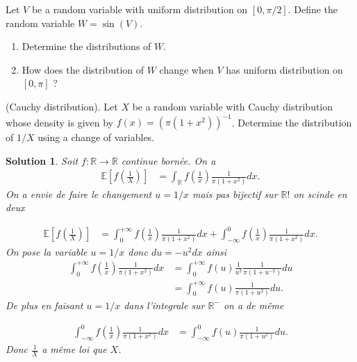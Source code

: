 \documentclass{article}
\newtheorem{solution}{Solution}
\begin{document}
\begin{Exercise} Let $V$ be a random variable with uniform distribution on $[0, \pi / 2]$. Define the random variable $W=\sin (V)$.
  \begin{enumerate}
    \item Determine the distributions of $W$.

    \item How does the distribution of $W$ change when $V$ has uniform distribution on
          $[0, \pi]$ ?

  \end{enumerate}
\end{Exercise}

\begin{Exercise} (Cauchy distribution). Let $X$ be a random variable with Cauchy distribution whose density is given by $f(x)=\left(\pi\left(1+x^{2}\right)\right)^{-1}$. Determine the distribution of $1 / X$ using a change of variables.
\end{Exercise}

\begin{solution}
  Soit $f:\mathbb R\longrightarrow \mathbb R$ continue born\'ee. On a
  \begin{align*}
    \mathbb E[f(\frac1X)] & =\int_\mathbb R f(\frac1x) \frac{1}{\pi(1+x^2)} dx.
  \end{align*}
  On a envie de faire le changement $u=1/x$ mais pas bijectif sur $\mathbb R!$ on scinde en deux

  \begin{align*}
    \mathbb E[f(\frac1X)] & =\int_0^{+\infty} f(\frac1x) \frac{1}{\pi(1+x^2)} dx+ \int_{-\infty}^0 f(\frac1x) \frac{1}{\pi(1+x^2)} dx.
  \end{align*}
  On pose la variable $u=1/x$ donc $du=-u^2 dx$ ainsi
  \begin{align*}
    \int_0^{+\infty} f(\frac1x) \frac{1}{\pi(1+x^2)} dx & =\int_0^{+\infty} f(u)\frac{1}{u^2}  \frac{1}{\pi(1+u^{-2})} du \\
                                                        & =\int_0^{+\infty} f(u) \frac{1}{\pi(1+u^2)} du.
  \end{align*}
  De plus en faisant $u=1/x$ dans l'integrale sur $\mathbb R^-$ on a de m\^eme

  \begin{align*}
    \int_{-\infty}^0 f(\frac1x) \frac{1}{\pi(1+x^2)} dx & =\int_{-\infty}^0 f(u) \frac{1}{\pi(1+u^2)} du.
  \end{align*}
  Donc $\frac1X$ a m\^eme loi que $X$.
\end{solution}
\end{document}
